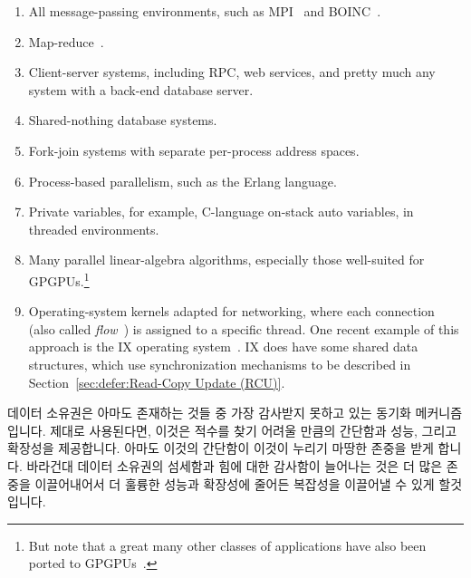 \begin{enumerate}
\item	All message-passing environments, such as MPI~\cite{MPIForum2008}
	and BOINC~\cite{BOINC2008}.
\item	Map-reduce~\cite{MapReduce2008MIT}.
\item	Client-server systems, including RPC, web services, and
	pretty much any system with a back-end database server.
\item	Shared-nothing database systems.
\item	Fork-join systems with separate per-process address spaces.
\item	Process-based parallelism, such as the Erlang language.
\item	Private variables, for example, C-language on-stack auto variables,
	in threaded environments.
\item	Many parallel linear-algebra algorithms, especially those
	well-suited for GPGPUs.\footnote{
		But note that a great many other classes of applications
		have also been ported to
		GPGPUs~\cite{NormMatloff2013ParProcBook,AMD2017OpenCL,NVidia2017GPGPU,NVidia2017GPGPU-university}.}
\item	Operating-system kernels adapted for networking, where each connection
	(also called \emph{flow}~\cite{Shenker89,ZhangPhD,McKenney90})
	is assigned to a specific thread.
	One recent example of this approach is the IX operating
	system~\cite{Belay:2016:IOS:3014162.2997641}.
	IX does have some shared data structures, which use synchronization
	mechanisms to be described in
	Section~\ref{sec:defer:Read-Copy Update (RCU)}.
\fi
\end{enumerate}

데이터 소유권은 아마도 존재하는 것들 중 가장 감사받지 못하고 있는 동기화
메커니즘입니다.
제대로 사용된다면, 이것은 적수를 찾기 어려울 만큼의 간단함과 성능, 그리고
확장성을 제공합니다.
아마도 이것의 간단함이 이것이 누리기 마땅한 존중을 받게 합니다.
바라건대 데이터 소유권의 섬세함과 힘에 대한 감사함이 늘어나는 것은 더 많은
존중을 이끌어내어서 더 훌륭한 성능과 확장성에 줄어든 복잡성을 이끌어낼 수 있게
할것입니다.
\iffalse

Data ownership is perhaps the most underappreciated synchronization
mechanism in existence.
When used properly, it delivers unrivaled simplicity, performance,
and scalability.
Perhaps its simplicity costs it the respect that it deserves.
Hopefully a greater appreciation for the subtlety and power of data ownership
will lead to greater level of respect, to say nothing of leading to
greater performance and scalability coupled with reduced complexity.
\fi

